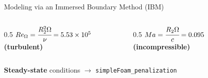 \documentclass[10pt, aspectratio=169, dvipsnames]{beamer}
\begin{document}
\begin{frame}{Modeling via an Immersed Boundary Method (IBM)}
\begin{itemize}
\end{itemize}

\pause 
\vspace{1cm}

    \begin{columns}
        \begin{column}{0.5\linewidth}
            \centering
            $Re_\Omega=\cfrac{R_2^2 \Omega}{\nu} = 5.53\times10^5$ \textrm{\textbf{(turbulent)}}
        \end{column}
        \begin{column}{0.5\linewidth}
            \centering
            $Ma = \cfrac{R_2 \Omega}{c} = 0.095$ \textrm{\textbf{(incompressible)}}
        \end{column}
    \end{columns}

\centering
\textbf{Steady-state} conditions $\rightarrow$ \texttt{simpleFoam\_penalization}
\end{frame}
\end{document}
